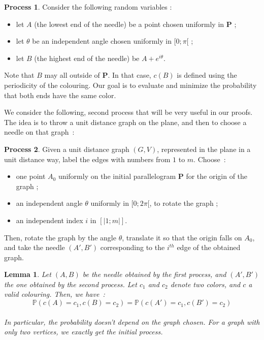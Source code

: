 \documentclass[a4paper,11pt]{article}
\newtheorem{lemma}{Lemma}
\theoremstyle{definition}
\newtheorem{process}{Process}
\theoremstyle{remark}
\begin{document}
\begin{process} \label{premier}
Consider the following random variables :
\begin{itemize}
  \item let $A$ (the lowest end of the needle) be a point chosen uniformly 
  in $\mathbf{P}$ ;
  \item let $\theta$ be an independent angle chosen uniformly in $[0;\pi[$ ;
  \item let $B$ (the highest end of the needle) be $A + e^{i \theta}$.
\end{itemize}
\end{process}

Note that $B$ may all outside of $\mathbf{P}$. In that case, $c(B)$ is 
defined using the periodicity of the colouring.
Our goal is to evaluate and minimize the probability that both ends have the 
same color.

We consider the following, second process that will be very useful in our 
proofs. The idea is to throw a unit distance graph on the 
plane, and then to choose a needle on that graph~:
\begin{process}
Given a unit distance graph $(G,V)$, represented in the plane in 
a unit distance way, label the edges with numbers from 
$1$ to $m$. Choose~: 
\begin{itemize}
\item one point $A_0$ uniformly on the initial parallelogram $\mathbf{P}$ for 
the origin of the graph ;
\item an independent angle $\theta$ uniformly in $[0;2\pi[$, to rotate the graph ;
\item an independent index $i$ in $[| 1;m|]$.
\end{itemize}
Then, rotate the graph by the angle $\theta$, translate it so that the origin 
falls on  $A_0$, and take the needle $(A',B')$ corresponding to the $i^{th}$ 
edge of the obtained graph.
\end{process}

\begin{lemma}\label{huitre}
Let $(A,B)$ be the needle obtained by the first process, and
$(A',B')$ the one obtained by the second process. Let $c_1$ and $c_2$ denote 
two colors, and $c$ a valid colouring. Then, we 
have~:\\
 $$\mathbb{P}(c(A) = c_1, c(B) = c_2) = \mathbb{P}(c(A') = c_1, c(B') = c_2) $$ \\
 In particular, the probability doesn't depend on the graph 
 chosen. For a graph with only two vertices, we exactly get the initial process.
\end{lemma}
\end{document}
